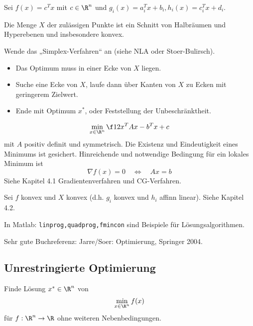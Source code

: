 \documentclass[11pt]{scrartcl}
\begin{document}
\begin{seg}
	\begin{description}
		\item[Lineares Optimierungsproblem, „\emph{lineare Programme}“ (LP)]
			Sei $f(x) = c^Tx$ mit $c\in \R^n$ und  $g_i(x) = a_i^Tx + b_i, h_i(x) = c_i^Tx + d_i$.

			Die Menge $X$ der zulässigen Punkte ist ein Schnitt von Halbräumen und Hyperebenen und insbesondere konvex.
			
			Wende das „Simplex-Verfahren“ an (siehe NLA oder Stoer-Bulirsch).
			\begin{itemize}
				\item
					Das Optimum muss in einer Ecke von $X$ liegen.
				\item
					Suche eine Ecke von $X$, laufe dann über Kanten von $X$ zu Ecken mit geringerem Zielwert.
				\item
					Ende mit Optimum $x^*$, oder Feststellung der Unbeschränktheit.
			\end{itemize}
		\item[Unrestringierte Quadratische Optimierung, „\emph{Quadratische Programme}“]
			\[
				\min_{x\in\R^n} \f 12 x^TAx - b^Tx + c 
			\]
			mit $A$ positiv definit und symmetrisch.
			Die Existenz und Eindeutigkeit eines Minimums ist gesichert.
			Hinreichende und notwendige Bedingung für ein lokales Minimum ist
			\[
				\nabla f(x) = 0 \quad \iff \quad Ax = b
			\]
			Siehe Kapitel 4.1 Gradientenverfahren und CG-Verfahren.
		\item[Konvexe Optimierung]
			Sei $f$ konvex und $X$ konvex (d.h. $g_i$ konvex und $h_i$ affinn linear).
			Siehe Kapitel 4.2.
		\item
			In Matlab: \verb|linprog,quadprog,fmincon| sind Beispiele für Lösungsalgorithmen.
		\item
			Sehr gute Buchreferenz: Jarre/Soer: Optimierung, Springer 2004.
	\end{description}
\end{seg}

\subsection{Unrestringierte Optimierung}

\begin{seg}[Problem]
	Finde Lösung $x^*\in \R^n$ von
	\[
		\min_{x\in\R^n}f(x)
	\]
	für $f: \R^n \to \R$ ohne weiteren Nebenbedingungen.
\end{seg}
\end{document}
